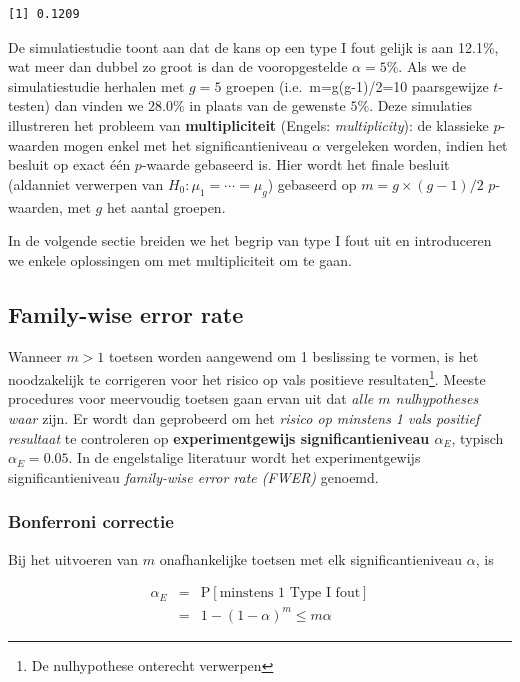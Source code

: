 \documentclass[
  dutch,
  letterpaper,
  12pt]{book}
\theoremstyle{definition}
\theoremstyle{definition}
\theoremstyle{definition}
\theoremstyle{remark}
\begin{document}
\begin{verbatim}
[1] 0.1209
\end{verbatim}

De simulatiestudie toont aan dat de kans op een type I fout gelijk is
aan 12.1\%, wat meer dan dubbel zo groot is dan de vooropgestelde
\(\alpha=5\%\). Als we de simulatiestudie herhalen met \(g=5\) groepen
(i.e.~m=g(g-1)/2=10 paarsgewijze \(t\)-testen) dan vinden we \(28.0\%\)
in plaats van de gewenste \(5\%\). Deze simulaties illustreren het
probleem van \textbf{multipliciteit} (Engels: \emph{multiplicity}): de
klassieke \(p\)-waarden mogen enkel met het significantieniveau
\(\alpha\) vergeleken worden, indien het besluit op exact één
\(p\)-waarde gebaseerd is. Hier wordt het finale besluit (aldanniet
verwerpen van \(H_0: \mu_1=\cdots =\mu_g\)) gebaseerd op
\(m=g\times(g-1)/2\) \(p\)-waarden, met \(g\) het aantal groepen.

In de volgende sectie breiden we het begrip van type I fout uit en
introduceren we enkele oplossingen om met multipliciteit om te gaan.

\subsection{Family-wise error rate}\label{family-wise-error-rate}

Wanneer \(m>1\) toetsen worden aangewend om 1 beslissing te vormen, is
het noodzakelijk te corrigeren voor het risico op vals positieve
resultaten\footnote{De nulhypothese onterecht verwerpen}. Meeste
procedures voor meervoudig toetsen gaan ervan uit dat \emph{alle \(m\)
nulhypotheses waar} zijn. Er wordt dan geprobeerd om het \emph{risico op
minstens 1 vals positief resultaat} te controleren op
\textbf{experimentgewijs significantieniveau \(\alpha_E\)}, typisch
\(\alpha_E=0.05\). In de engelstalige literatuur wordt het
experimentgewijs significantieniveau \emph{family-wise error rate
(FWER)} genoemd.

\subsubsection{Bonferroni correctie}\label{bonferroni-correctie}

Bij het uitvoeren van \(m\) onafhankelijke toetsen met elk
significantieniveau \(\alpha\), is

\begin{eqnarray*}
\alpha_E&=&\text{P}[\text{minstens 1 Type I fout}]\\
&=&1-(1-\alpha)^m \leq m\alpha
\end{eqnarray*}
\end{document}
